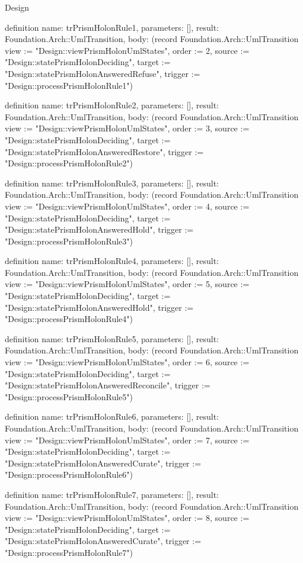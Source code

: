 \begin{lexlean}{Design}
\begin{semanticmodule}
definition{
  name: trPrismHolonRule1,
  parameters: [],
  result: Foundation.Arch::UmlTransition,
  body: (record Foundation.Arch::UmlTransition {view := "Design::viewPrismHolonUmlStates", order := 2, source := "Design::statePrismHolonDeciding", target := "Design::statePrismHolonAnsweredRefuse", trigger := "Design::processPrismHolonRule1"})
}

definition{
  name: trPrismHolonRule2,
  parameters: [],
  result: Foundation.Arch::UmlTransition,
  body: (record Foundation.Arch::UmlTransition {view := "Design::viewPrismHolonUmlStates", order := 3, source := "Design::statePrismHolonDeciding", target := "Design::statePrismHolonAnsweredRestore", trigger := "Design::processPrismHolonRule2"})
}

definition{
  name: trPrismHolonRule3,
  parameters: [],
  result: Foundation.Arch::UmlTransition,
  body: (record Foundation.Arch::UmlTransition {view := "Design::viewPrismHolonUmlStates", order := 4, source := "Design::statePrismHolonDeciding", target := "Design::statePrismHolonAnsweredHold", trigger := "Design::processPrismHolonRule3"})
}

definition{
  name: trPrismHolonRule4,
  parameters: [],
  result: Foundation.Arch::UmlTransition,
  body: (record Foundation.Arch::UmlTransition {view := "Design::viewPrismHolonUmlStates", order := 5, source := "Design::statePrismHolonDeciding", target := "Design::statePrismHolonAnsweredHold", trigger := "Design::processPrismHolonRule4"})
}

definition{
  name: trPrismHolonRule5,
  parameters: [],
  result: Foundation.Arch::UmlTransition,
  body: (record Foundation.Arch::UmlTransition {view := "Design::viewPrismHolonUmlStates", order := 6, source := "Design::statePrismHolonDeciding", target := "Design::statePrismHolonAnsweredReconcile", trigger := "Design::processPrismHolonRule5"})
}

definition{
  name: trPrismHolonRule6,
  parameters: [],
  result: Foundation.Arch::UmlTransition,
  body: (record Foundation.Arch::UmlTransition {view := "Design::viewPrismHolonUmlStates", order := 7, source := "Design::statePrismHolonDeciding", target := "Design::statePrismHolonAnsweredCurate", trigger := "Design::processPrismHolonRule6"})
}

definition{
  name: trPrismHolonRule7,
  parameters: [],
  result: Foundation.Arch::UmlTransition,
  body: (record Foundation.Arch::UmlTransition {view := "Design::viewPrismHolonUmlStates", order := 8, source := "Design::statePrismHolonDeciding", target := "Design::statePrismHolonAnsweredCurate", trigger := "Design::processPrismHolonRule7"})
}


\end{semanticmodule}
\end{lexlean}
